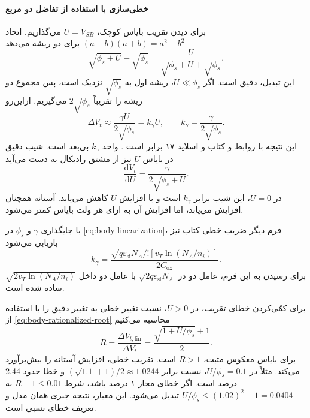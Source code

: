 \paragraph*{خطی‌سازی با استفاده از تفاضل دو مربع}
برای دیدن تقریب بایاس کوچک، \(U=V_{SB}\) می‌گذاریم. اتحاد
\((a-b)(a+b)=a^2-b^2\) برای دو ریشه می‌دهد
\begin{equation}
 \sqrt{\phi_s+U}-\sqrt{\phi_s}
 =\frac{U}{\sqrt{\phi_s+U}+\sqrt{\phi_s}}.
 \label{eq:body-rationalized-root}
\end{equation}
این تبدیل، دقیق است. اگر \(U\ll\phi_s\)، ریشه اول به
\(\sqrt{\phi_s}\) نزدیک است، پس مجموع دو ریشه را تقریباً
\(2\sqrt{\phi_s}\) می‌گیریم. ازاین‌رو
\begin{equation}
 \Delta V_t\approx\frac{\gamma U}{2\sqrt{\phi_s}}
 =k_\gamma U,\qquad
 k_\gamma=\frac{\gamma}{2\sqrt{\phi_s}}.
 \label{eq:body-linearization}
\end{equation}
این نتیجه با روابط  و  کتاب و اسلاید ۱۷
برابر است \cite{weste,nonideal}. واحد \(k_\gamma\) بی‌بعد است.
شیب دقیق در بایاس \(U\) نیز از مشتق رادیکال به دست می‌آید
\begin{equation}
 \frac{\mathrm{d}V_t}{\mathrm{d}U}
 =\frac{\gamma}{2\sqrt{\phi_s+U}}.
 \label{eq:body-slope}
\end{equation}
در \(U=0\)، این شیب برابر \(k_\gamma\) است و با افزایش \(U\) کاهش
می‌یابد. آستانه همچنان افزایش می‌یابد، اما افزایش آن به ازای هر ولت
بایاس کمتر می‌شود.

با جایگذاری \(\gamma\) و \(\phi_s\) در \eqref{eq:body-linearization}،
فرم دیگر ضریب خطی کتاب نیز بازیابی می‌شود
\begin{equation}
 k_\gamma=
 \frac{\sqrt{q\varepsilon_{\mathrm{si}}N_A/!
 \left[v_T\ln(N_A/n_i)\right]}}{2C_{\mathrm{ox}}}.
 \label{eq:body-linear-coefficient-expanded}
\end{equation}
برای رسیدن به این فرم، عامل دو در
\(\sqrt{2q\varepsilon_{\mathrm{si}}N_A}\) با عامل دو داخل
\(\sqrt{2v_T\ln(N_A/n_i)}\) ساده شده است.

برای کمّی‌کردن خطای تقریب، در \(U>0\)، نسبت تغییر خطی به تغییر دقیق
را با استفاده از \eqref{eq:body-rationalized-root} محاسبه می‌کنیم
\begin{equation}
 R=\frac{\Delta V_{t,\mathrm{lin}}}{\Delta V_t}
 =\frac{\sqrt{1+U/\phi_s}+1}{2}.
 \label{eq:body-linear-error}
\end{equation}
برای بایاس معکوس مثبت، \(R>1\) است. تقریب خطی، افزایش آستانه را
بیش‌برآورد می‌کند. مثلاً در \(U/\phi_s=0.1\)، نسبت برابر
\((\sqrt{1.1}+1)/2\approx1.0244\) و خطا حدود \num{2.44} درصد است.
اگر خطای مجاز ۱ درصد باشد، شرط \(R-1\le0.01\) به
\(U/\phi_s\le(1.02)^2-1=0.0404\) تبدیل می‌شود.
این معیار، نتیجه جبری همان مدل و تعریف خطای نسبی است.

